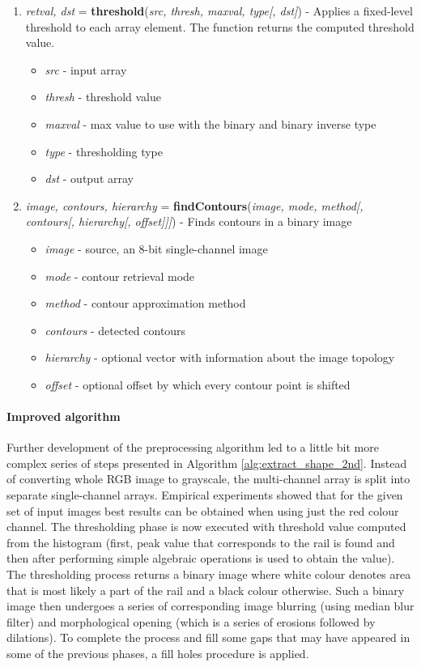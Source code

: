 \begin{enumerate}
	\item \textit{retval, dst} = \textbf{threshold}(\textit{src, thresh, maxval, type[, dst]}) - Applies a fixed-level threshold to each array element. The function returns the computed threshold value. \small{\begin{itemize}
		\item \textit{src} - input array
		\item \textit{thresh} - threshold value
		\item \textit{maxval} - max value to use with the binary and binary inverse type
		\item \textit{type} - thresholding type
		\item \textit{dst} - output array
	\end{itemize}}
	\item \textit{image, contours, hierarchy} = \textbf{findContours}(\textit{image, mode, method[, contours[, hierarchy[, offset]]]}) - Finds contours in a binary image \small{\begin{itemize}
		\item \textit{image} - source, an 8-bit single-channel image
		\item \textit{mode} - contour retrieval mode
		\item \textit{method} - contour approximation method
		\item \textit{contours} - detected contours
		\item \textit{hierarchy} - optional vector with information about the image topology
		\item \textit{offset} - optional offset by which every contour point is shifted
	\end{itemize}}
\end{enumerate}

\paragraph{Improved algorithm}
Further development of the preprocessing algorithm led to a little bit more complex series of steps presented in Algorithm \ref{alg:extract_shape_2nd}. Instead of converting whole RGB image to grayscale, the multi-channel array is split into separate single-channel arrays. Empirical experiments showed that for the given set of input images best results can be obtained when using just the red colour channel. The thresholding phase is now executed with threshold value computed from the histogram (first, peak value that corresponds to the rail is found and then after performing simple algebraic operations is used to obtain the value). The thresholding process returns a binary image where white colour denotes area that is most likely a part of the rail and a black colour otherwise. Such a binary image then undergoes a series of corresponding image blurring (using median blur filter) and morphological opening (which is a series of erosions followed by dilations). To complete the process and fill some gaps that may have appeared in some of the previous phases, a fill holes procedure is applied.

